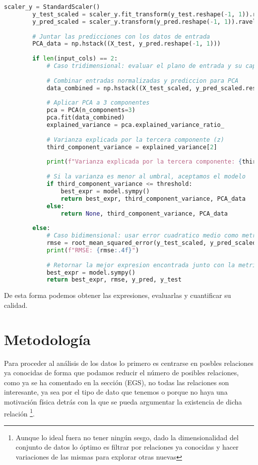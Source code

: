 \documentclass[11pt, a4paper]{article} %
\begin{document}
\begin{lstlisting}[language=Python, caption=Implementación del modelo de regresión simbólica, basicstyle=\tiny,label=lst:foo]
        scaler_y = StandardScaler()
        y_test_scaled = scaler_y.fit_transform(y_test.reshape(-1, 1)).ravel()
        y_pred_scaled = scaler_y.transform(y_pred.reshape(-1, 1)).ravel()
    
        # Juntar las predicciones con los datos de entrada
        PCA_data = np.hstack((X_test, y_pred.reshape(-1, 1)))
    
        if len(input_cols) == 2:
            # Caso tridimensional: evaluar el plano de entrada y su capacidad explicativa
    
            # Combinar entradas normalizadas y prediccion para PCA
            data_combined = np.hstack((X_test_scaled, y_pred_scaled.reshape(-1, 1)))
    
            # Aplicar PCA a 3 componentes
            pca = PCA(n_components=3)
            pca.fit(data_combined)
            explained_variance = pca.explained_variance_ratio_
    
            # Varianza explicada por la tercera componente (z)
            third_component_variance = explained_variance[2]
    
            print(f"Varianza explicada por la tercera componente: {third_component_variance:.4f}")
    
            # Si la varianza es menor al umbral, aceptamos el modelo
            if third_component_variance <= threshold:
                best_expr = model.sympy()
                return best_expr, third_component_variance, PCA_data
            else:
                return None, third_component_variance, PCA_data
    
        else:
            # Caso bidimensional: usar error cuadratico medio como metrica
            rmse = root_mean_squared_error(y_test_scaled, y_pred_scaled)
            print(f"RMSE: {rmse:.4f}")
    
            # Retornar la mejor expresion encontrada junto con la metrica
            best_expr = model.sympy()
            return best_expr, rmse, y_pred, y_test
    \end{lstlisting}

De esta forma podemos obtener las expresiones, evaluarlas y cuantificar su calidad.

\section{Metodología}

Para proceder al análisis de los datos lo primero es centrarse en posbles relaciones ya conocidas de forma que podamos reducir el número de posibles relaciones, como ya se ha comentado 
en la sección (EGS), no todas las relaciones son interesante, ya sea por el tipo de dato que tenemos o porque no haya una motivación física detrás con la que se pueda argumentar la existencia de dicha relación
\footnote{Aunque lo ideal fuera no tener ningún sesgo, dado la dimensionalidad del conjunto de datos lo óptimo es filtrar por relaciones ya conocidas y hacer variaciones de las mismas para explorar otras nuevas}.
\end{document}

